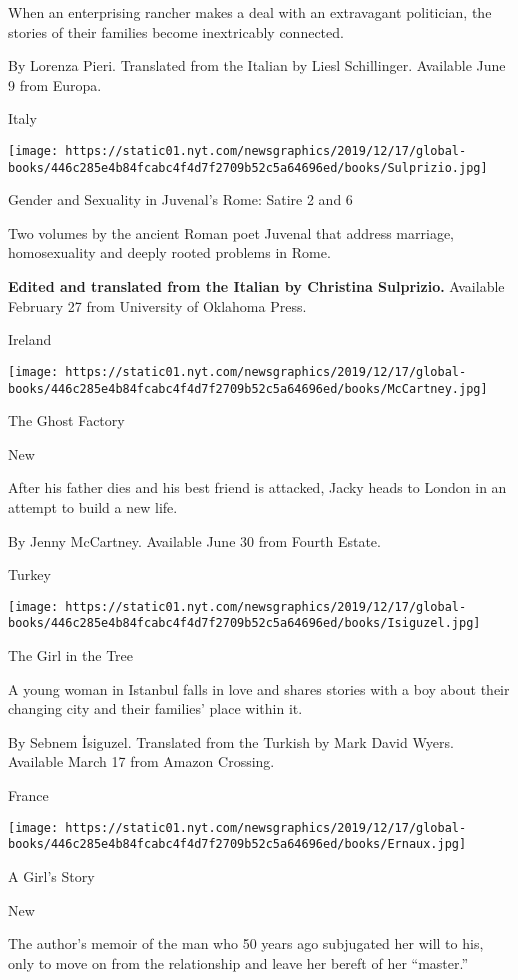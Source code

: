 When an enterprising rancher makes a deal with an extravagant
politician, the stories of their families become inextricably connected.

 By Lorenza Pieri. Translated from the Italian by Liesl Schillinger.
Available June 9 from Europa.

Italy

\texttt{[image: https://static01.nyt.com/newsgraphics/2019/12/17/global-books/446c285e4b84fcabc4f4d7f2709b52c5a64696ed/books/Sulprizio.jpg]}

Gender and Sexuality in Juvenal's Rome: Satire 2 and 6

Two volumes by the ancient Roman poet Juvenal that address marriage,
homosexuality and deeply rooted problems in Rome.

 \textbf{Edited and translated from the Italian by Christina Sulprizio.}
Available February 27 from University of Oklahoma Press.

Ireland

\texttt{[image: https://static01.nyt.com/newsgraphics/2019/12/17/global-books/446c285e4b84fcabc4f4d7f2709b52c5a64696ed/books/McCartney.jpg]}

The Ghost Factory

New

After his father dies and his best friend is attacked, Jacky heads to
London in an attempt to build a new life.

 By Jenny McCartney. Available June 30 from Fourth Estate.

Turkey

\texttt{[image: https://static01.nyt.com/newsgraphics/2019/12/17/global-books/446c285e4b84fcabc4f4d7f2709b52c5a64696ed/books/Isiguzel.jpg]}

The Girl in the Tree

A young woman in Istanbul falls in love and shares stories with a boy
about their changing city and their families' place within it.

 By Sebnem İsiguzel. Translated from the Turkish by Mark David Wyers.
Available March 17 from Amazon Crossing.

France

\texttt{[image: https://static01.nyt.com/newsgraphics/2019/12/17/global-books/446c285e4b84fcabc4f4d7f2709b52c5a64696ed/books/Ernaux.jpg]}

A Girl's Story

New

The author's memoir of the man who 50 years ago subjugated her will to
his, only to move on from the relationship and leave her bereft of her
``master.''

